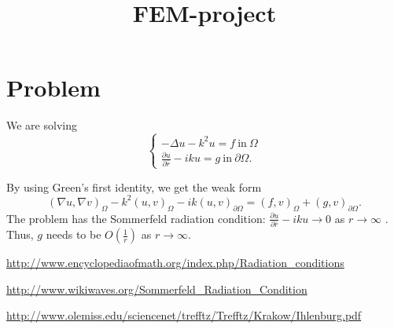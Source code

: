 \documentclass[a4paper,12pt]{article}
\begin{document}
\title{FEM-project}
\author{}
\date{}
\maketitle
\section*{Problem}
We are solving \[ \begin{cases}
-\Delta u - k^2 u = f \ \mathrm{in} \ \Omega \\ \frac{\partial u}{\partial \bar{r}} - iku = g \ \mathrm{in} \ \partial \Omega.
\end{cases} \]

By using Green's first identity, we get the weak form \begin{equation*}
(\nabla u, \nabla v)_{\Omega} - k^2(u, v)_{\Omega} - ik(u, v)_{\partial \Omega} = (f, v)_{\Omega} + (g, v)_{\partial \Omega}.
\end{equation*} The problem has the Sommerfeld radiation condition: $\frac{\partial u}{\partial \bar{r}} - iku \rightarrow 0$ as $r \rightarrow \infty$ \cite{eom} \cite{wikiwaves}. Thus, $g$ needs to be $O(\frac{1}{r})$ as $r \rightarrow \infty$.

\begin{thebibliography}{9}

\url{http://www.encyclopediaofmath.org/index.php/Radiation_conditions}

\url{http://www.wikiwaves.org/Sommerfeld_Radiation_Condition}

\url{http://www.olemiss.edu/sciencenet/trefftz/Trefftz/Krakow/Ihlenburg.pdf}

\end{thebibliography}
\end{document}
